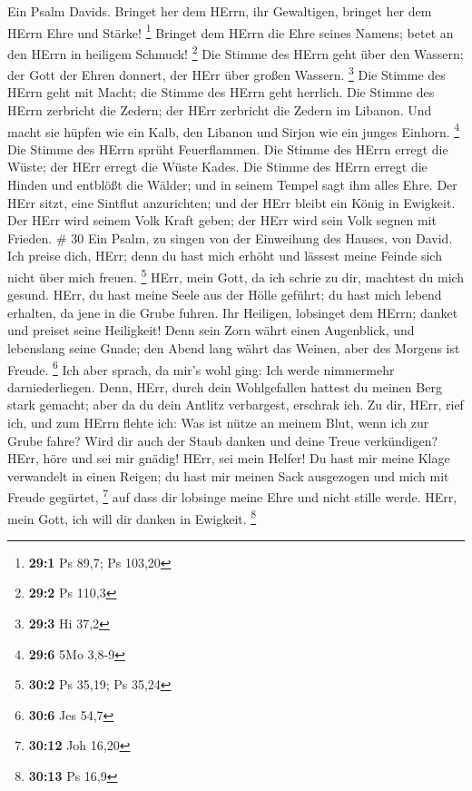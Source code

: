 Ein Psalm Davids. Bringet her dem HErrn, ihr Gewaltigen,
bringet her dem HErrn Ehre und Stärke! \footnote{\textbf{29:1} Ps 89,7;
  Ps 103,20}  Bringet dem HErrn die Ehre seines Namens;
betet an den HErrn in heiligem Schmuck! \footnote{\textbf{29:2} Ps 110,3}
 Die Stimme des HErrn geht über den Wassern; der Gott der
Ehren donnert, der HErr über großen Wassern. \footnote{\textbf{29:3} Hi
  37,2}  Die Stimme des HErrn geht mit Macht; die Stimme des
HErrn geht herrlich.  Die Stimme des HErrn zerbricht die
Zedern; der HErr zerbricht die Zedern im Libanon.  Und macht
sie hüpfen wie ein Kalb, den Libanon und Sirjon wie ein junges Einhorn.
\footnote{\textbf{29:6} 5Mo 3,8-9}  Die Stimme des HErrn
sprüht Feuerflammen.  Die Stimme des HErrn erregt die Wüste;
der HErr erregt die Wüste Kades.  Die Stimme des HErrn
erregt die Hinden und entblößt die Wälder; und in seinem Tempel sagt ihm
alles Ehre.  Der HErr sitzt, eine Sintflut anzurichten; und
der HErr bleibt ein König in Ewigkeit.  Der HErr wird
seinem Volk Kraft geben; der HErr wird sein Volk segnen mit Frieden. \#
30  Ein Psalm, zu singen von der Einweihung des Hauses, von
David.  Ich preise dich, HErr; denn du hast mich erhöht und
lässest meine Feinde sich nicht über mich freuen. \footnote{\textbf{30:2}
  Ps 35,19; Ps 35,24}  HErr, mein Gott, da ich schrie zu
dir, machtest du mich gesund.  HErr, du hast meine Seele aus
der Hölle geführt; du hast mich lebend erhalten, da jene in die Grube
fuhren.  Ihr Heiligen, lobsinget dem HErrn; danket und
preiset seine Heiligkeit!  Denn sein Zorn währt einen
Augenblick, und lebenslang seine Gnade; den Abend lang währt das Weinen,
aber des Morgens ist Freude. \footnote{\textbf{30:6} Jes 54,7}
 Ich aber sprach, da mir's wohl ging: Ich werde nimmermehr
darniederliegen.  Denn, HErr, durch dein Wohlgefallen
hattest du meinen Berg stark gemacht; aber da du dein Antlitz
verbargest, erschrak ich.  Zu dir, HErr, rief ich, und zum
HErrn flehte ich:  Was ist nütze an meinem Blut, wenn ich
zur Grube fahre? Wird dir auch der Staub danken und deine Treue
verkündigen?  HErr, höre und sei mir gnädig! HErr, sei mein
Helfer!  Du hast mir meine Klage verwandelt in einen
Reigen; du hast mir meinen Sack ausgezogen und mich mit Freude gegürtet,
\footnote{\textbf{30:12} Joh 16,20}  auf dass dir lobsinge
meine Ehre und nicht stille werde. HErr, mein Gott, ich will dir danken
in Ewigkeit. \footnote{\textbf{30:13} Ps 16,9}

